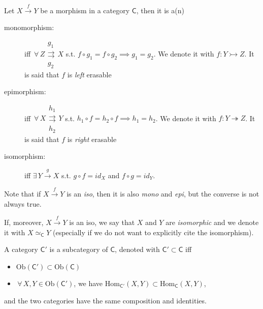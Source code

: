\begin{defn}
	Let $X \xrightarrow{f} Y$ be a morphism in a category $\mathsf{C}$, then it is a(n)
	\begin{description}
		\item[monomorphism:] iff $\,\forall\, Z \begin{matrix} g_1 \\ \rightrightarrows \\ g_2 \end{matrix} X$ s.t. $f \circ g_1 = f \circ g_2 \implies g_1 = g_2$.
			We denote it with $f: Y \rightarrowtail Z$.
			It is said that $f$ is {\em left} erasable
		\item[epimorphism:] iff $\,\forall\, X \begin{matrix} h_1 \\ \rightrightarrows \\ h_2 \end{matrix} Y$ s.t. $h_1 \circ f = h_2 \circ f \implies h_1 = h_2$.
			We denote it with $f: Y \twoheadrightarrow Z$.
			It is said that $f$ is {\em right} erasable
		\item[isomorphism:] iff $\exists\,  Y \xrightarrow{g} X$ s.t. $g \circ f = id_X$ and $f \circ g = id_Y$.
	\end{description} 	
\end{defn}

\begin{rem}
	Note that if $X \xrightarrow{f} Y$ is an {\em iso}, then it is also {\em mono} and {\em epi}, but the converse is not always true.

	If, moreover, $X \xrightarrow{f} Y$ is an iso, we say that $X$ and $Y$ are {\em isomorphic} and we denote it with $X \simeq_{\mathsf{C}} Y$ (especially if we do not want to explicitly cite the isomorphism).
\end{rem}

\begin{defn}[Subcategory]
	A category $\mathsf{C}'$ is a subcategory of $\mathsf{C}$, denoted with $\mathsf{C}' \subset \mathsf{C}$ iff
	\begin{itemize}
		\item $\mathrm{Ob}(\mathsf{C}') \subset \mathrm{Ob}(\mathsf{C})$
		\item $\,\forall\, X,Y \in \mathrm{Ob}(\mathsf{C}')$, we have $\mathrm{Hom}_{\mathsf{C}'} \left( X, Y \right) \subset \mathrm{Hom}_{\mathsf{C}} \left( X, Y \right)$,
	\end{itemize} 
	and the two categories have the same composition and identities.
\end{defn}

